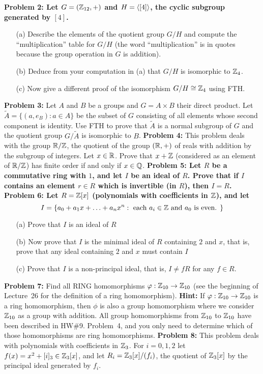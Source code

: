 \documentclass[11pt]{amsart}
\begin{document}
\skv
\bf{Problem 2: }\rm Let $G=({\mathbb Z}_{12},+)$ and $H={\langle} [4]{\rangle}$, the cyclic subgroup generated by $[4]$.
\begin{itemize}
\item[(a)] Describe the elements of the quotient group $G/H$ and compute the ``multiplication'' table for $G/H$
(the word ``multiplication'' is in quotes because the group operation in $G$ is addition).
\item[(b)] Deduce from your computation in (a) that $G/H$ is isomorphic to ${\mathbb Z}_4$.
\item[(c)] Now give a different proof of the isomorphism $G/H\cong {\mathbb Z}_4$ using FTH. 
\end{itemize}
{\bf Problem 3:} Let $A$ and $B$ be a groups and $G= A\times B$ their direct product. Let
$\widetilde A=\{(a, e_B) : a\in A\}$ be the subset of $G$ consisting of all elements whose second
component is identity. Use FTH to prove that $\widetilde A$ is a normal subgroup of $G$
and the quotient group $G/\widetilde A$ is isomorphic to $B$.
\skv
{\bf Problem 4:} This problem deals with the group ${\mathbb R}/{\mathbb Z}$, the quotient of
the group $({\mathbb R},+)$ of reals with addition by the subgroup of integers.
Let $x\in{\mathbb R}$. Prove that $x+{\mathbb Z}$ (considered as an element of ${\mathbb R}/{\mathbb Z}$) has finite order if and only if $x\in{\mathbb Q}$.
\skv
\bf{Problem 5: }\rm Let $R$ be a commutative ring with $1$, and let $I$ be an ideal of $R$.
Prove that if $I$ contains an element $r\in R$ which is invertible (in $R$), then $I=R$.
\skv
\bf{Problem 6: }\rm Let $R={\mathbb Z}[x]$ (polynomials with coefficients in ${\mathbb Z}$),
and let 
$$I=\{a_0+a_1x+\ldots+ a_n x^n:\mbox{ each }a_i\in{\mathbb Z} \mbox{ and }a_0\mbox{ is even. }\}$$
\begin{itemize}
\item[(a)] Prove that $I$ is an ideal of $R$
\item[(b)] Now prove that $I$ is the minimal ideal  
of $R$ containing $2$ and $x$, that is, prove that any ideal containing $2$ and $x$ must contain $I$
\item[(c)] Prove that $I$ is a non-principal ideal, that is, 
$I\neq fR$ for any $f\in R$.
\end{itemize}
\skv
{\bf Problem 7:} Find all RING homomorphisms ${\varphi}:{\mathbb Z}_{10}\to{\mathbb Z}_{10}$ (see the beginning of Lecture~26 for
the definition of a ring homomorphism). {\bf Hint:} If
${\varphi}:{\mathbb Z}_{10}\to{\mathbb Z}_{10}$ is a ring homomorphism, then $\phi$ is also a group homomorphism where we consider
${\mathbb Z}_{10}$ as a group with addition. All group homomorphisms from ${\mathbb Z}_{10}$ to ${\mathbb Z}_{10}$ have been described
in HW\#9. Problem~4, and you only need to determine which of those homomorphisms are ring homomorphisms.
\skv
{\bf Problem 8:} This problem deals with polynomials with coefficients in ${\mathbb Z}_3$. For $i=0,1,2$
let $f(x)=x^2+[i]_3\in{\mathbb Z}_3[x]$, and let $R_i={\mathbb Z}_{3}[x]/(f_i)$, the quotient of ${\mathbb Z}_{3}[x]$ by the principal ideal generated by $f_i$.
\end{document}
